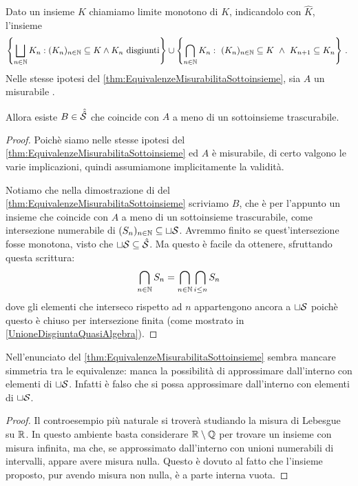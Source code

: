 \begin{corollary}\label{cor:ChiusuraMonotonaInsiemi}
	Dato un insieme $K$ chiamiamo limite monotono di $K$, indicandolo con $\hat K$, l'insieme
	\begin{equation*}
		\left\{\bigsqcup_{n\in\N}K_n:(K_n)_{n\in\N}\subseteq K\wedge K_n \text{ disgiunti}\right\}\cup
		\left\{\bigcap_{n\in\N}K_n:\ (K_n)_{n\in\N}\subseteq K\ \wedge\ K_{n+1}\subseteq K_n\right\} \punto
	\end{equation*}
	Nelle stesse ipotesi del \cref{thm:EquivalenzeMisurabilitaSottoinsieme}, sia $A$ un misurabile \sigfin[o].

	Allora esiste $B\in\hat{\hat\S}$ che coincide con $A$ a meno di un sottoinsieme trascurabile.
\end{corollary}
\begin{proof}
	Poichè siamo nelle stesse ipotesi del \cref{thm:EquivalenzeMisurabilitaSottoinsieme} ed $A$ è misurabile, di certo valgono le varie implicazioni, quindi assumiamone implicitamente la validità.
	
	Notiamo che nella dimostrazione di  del \cref{thm:EquivalenzeMisurabilitaSottoinsieme} scriviamo $B$, che è per l'appunto un insieme che coincide con $A$ a meno di un sottoinsieme trascurabile, come intersezione numerabile di $(S_n)_{n\in\N}\subseteq \sqcup \S$.
	Avremmo finito se quest'intersezione fosse monotona, visto che $\sqcup \S\subseteq \hat \S$.
	Ma questo è facile da ottenere, sfruttando questa scrittura:
	\begin{equation*}
		\bigcap_{n\in\N} S_n = \bigcap_{n\in\N} \bigcap_{i\le n} S_n
	\end{equation*}
	dove gli elementi che interseco rispetto ad $n$ appartengono ancora a $\sqcup \S$ poichè questo è chiuso per intersezione finita (come mostrato in \cref{UnioneDisgiuntaQuasiAlgebra}).
\end{proof}



\begin{remark}
	Nell'enunciato del \cref{thm:EquivalenzeMisurabilitaSottoinsieme} sembra mancare simmetria tra le equivalenze: manca la possibilità di approssimare dall'interno con elementi di $\sqcup\S$. Infatti è falso che si possa approssimare dall'interno con elementi di $\sqcup\S$.
\end{remark}
\begin{proof}
	Il controesempio più naturale si troverà studiando la misura di Lebesgue su $\R$. In questo ambiente basta considerare $\R\setminus\mathbb Q$ per trovare un insieme con misura infinita, ma che, se approssimato dall'interno con unioni numerabili di intervalli, appare avere misura nulla. Questo è dovuto al fatto che l'insieme proposto, pur avendo misura non nulla, è a parte interna vuota.
\end{proof}




